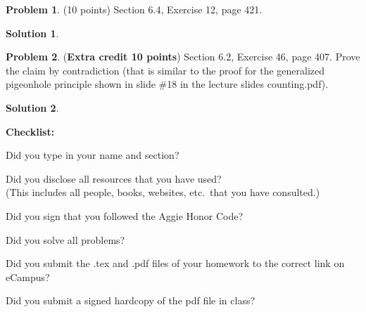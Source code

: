 \documentclass{article}
\theoremstyle{definition}
\newtheorem{problem}{Problem}
\newtheorem*{solution}{Solution}
\newcommand{\checklist}{\noindent\textbf{Checklist:}
\begin{compactitem}[$\Box$] 
\item Did you type in your name and section? 
\item Did you disclose all resources that you have used? \\
(This includes all people, books, websites, etc.\ that you have consulted.)
\item Did you sign that you followed the Aggie Honor Code? 
\item Did you solve all problems? 
\item Did you submit the .tex and .pdf files of your homework to the correct link on eCampus?
\item Did you submit a signed hardcopy of the pdf file in class? 
\end{compactitem}
}
\begin{document}
\begin{problem} (10 points) 
Section 6.4, Exercise 12, page 421.
\end{problem}
\begin{solution} 
\end{solution}

\begin{problem} (\textbf{Extra credit 10 points})
Section 6.2, Exercise 46, page 407.  Prove the claim by contradiction 
(that is similar to the proof for the generalized pigeonhole principle shown 
in slide \#18 in the lecture slides counting.pdf).
\end{problem}
\begin{solution} 
\end{solution}

\goodbreak
\checklist
\end{document}
